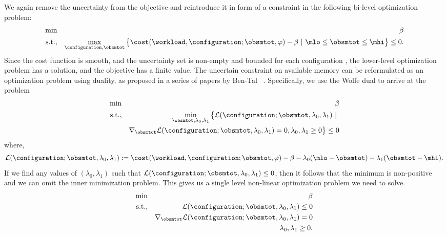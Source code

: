 We again remove the uncertainty from the objective and reintroduce it in form of
    a constraint in the following bi-level optimization problem:
\begin{eqnarray}
    \min &&{\beta} \nonumber\\
    \textrm{s.t.,}&&\max_{\configuration, \obsmtot}
    \big\{\cost(\workload, \configuration; \obsmtot, \varphi) -
        \beta\textrm{  }|\textrm{  } \mlo \leq \obsmtot \leq \mhi  \big\} \leq 0.
\end{eqnarray}
Since the cost function is smooth, and the uncertainty set is non-empty and
    bounded for each configuration {\configuration}, the lower-level optimization problem has a
    solution, and the objective has a finite value.
The uncertain constraint on available memory can be reformulated as an
    optimization problem using duality, as proposed in a series of papers by Ben-Tal 
    {\etal}~\citep{ben2002robust, ben2015deriving, Ben-Tal1998-ic}.
Specifically, we use the Wolfe dual to arrive at the problem
\begin{eqnarray}
    \min &&\beta \nonumber\\
    \textrm{s.t.,}&&\min_{\obsmtot, \lambda_0, \lambda_1}
    \big\{
        \mathcal{L}(\configuration; \obsmtot, \lambda_0, \lambda_1)
    \textrm{  }|\textrm{  }  \nonumber\\
    &&\nabla_\obsmtot\mathcal{L}(\configuration;
    \obsmtot, \lambda_0, \lambda_1) = 0, \lambda_0, \lambda_1 \geq 0 \big\} \leq 0 
\end{eqnarray}
where,
\begin{equation*}
    \mathcal{L}(\configuration; \obsmtot, \lambda_0, \lambda_1) :=
    \cost(\workload, \configuration; \obsmtot, \varphi) - \beta
    - \lambda_0(\mlo - \obsmtot)
    - \lambda_1(\obsmtot - \mhi).
\end{equation*}
If we find any values of $(\lambda_0, \lambda_1)$ such that 
    $\mathcal{L}(\configuration; \obsmtot, \lambda_0, \lambda_1) \leq 0$,
    then it follows that the minimum is non-positive and we can omit the inner
    minimization problem.
This gives us a single level non-linear optimization problem we need to solve.
\begin{eqnarray}
    \label{eq:final_dual_rewrite_memory}
    \min &&\beta \nonumber\\
    \textrm{s.t.,}&&\mathcal{L}(\configuration; \obsmtot,
    \lambda_0, \lambda_1) \leq 0 \nonumber \\
    &&\nabla_{\obsmtot}\mathcal{L}(\configuration;
    \obsmtot, \lambda_0, \lambda_1) = 0\nonumber\\
    &&\lambda_0, \lambda_1 \geq 0.
\end{eqnarray}

